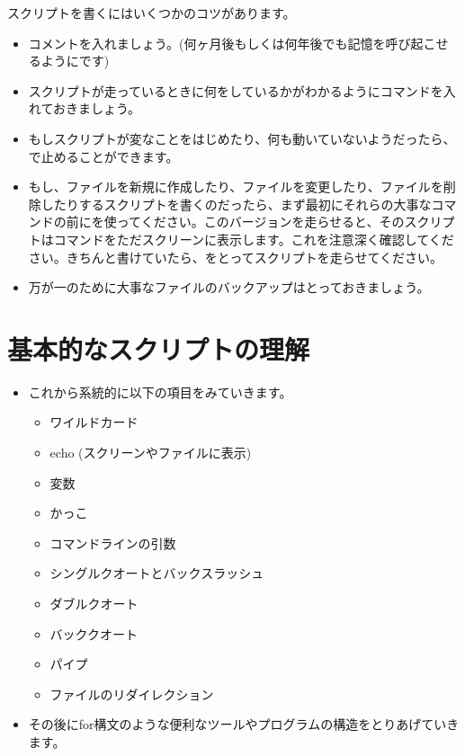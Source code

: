 \documentclass{jsarticle}
\begin{document}
スクリプトを書くにはいくつかのコツがあります。

\begin{itemize}
\item コメントを入れましょう。(何ヶ月後もしくは何年後でも記憶を呼び起こせるようにです)
\item スクリプトが走っているときに何をしているかがわかるように{\color{red}}コマンドを入れておきましょう。
\item もしスクリプトが変なことをはじめたり、何も動いていないようだったら、で止めることができます。
\item もし、ファイルを新規に作成したり、ファイルを変更したり、ファイルを削除したりするスクリプトを書くのだったら、まず最初にそれらの大事なコマンドの前に{\color{red}}を使ってください。このバージョンを走らせると、そのスクリプトはコマンドをただスクリーンに表示します。これを注意深く確認してください。きちんと書けていたら、{\color{red}}をとってスクリプトを走らせてください。
\item 万が一のために大事なファイルのバックアップはとっておきましょう。
\end{itemize}


\section{基本的なスクリプトの理解}


\begin{itemize}
\item これから系統的に以下の項目をみていきます。

	\begin{itemize}
	\item ワイルドカード
	\item echo (スクリーンやファイルに表示)
	\item 変数
	\item かっこ
	\item コマンドラインの引数
	\item シングルクオートとバックスラッシュ
	\item ダブルクオート
	\item バッククオート
	\item パイプ
	\item ファイルのリダイレクション
	\end{itemize}
\item その後にfor構文のような便利なツールやプログラムの構造をとりあげていきます。
\end{itemize}
\end{document}
